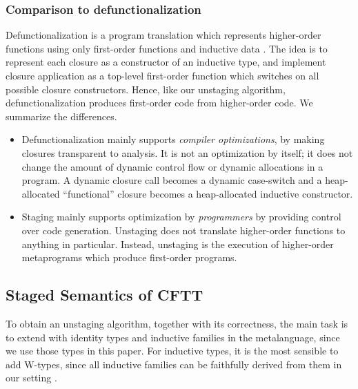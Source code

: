 \documentclass[acmsmall]{acmart}
\theoremstyle{remark}
\begin{document}
\subsubsection{Comparison to defunctionalization}
Defunctionalization is a program translation which represents higher-order
functions using only first-order functions and inductive data
\cite{DBLP:journals/lisp/Reynolds98a,DBLP:conf/ppdp/DanvyN01}. The idea is to
represent each closure as a constructor of an inductive type, and implement
closure application as a top-level first-order function which switches on all
possible closure constructors. Hence, like our unstaging algorithm,
defunctionalization produces first-order code from higher-order code. We summarize
the differences.
\begin{itemize}
\item Defunctionalization mainly supports \emph{compiler optimizations}, by making
  closures transparent to analysis. It is not an optimization by itself; it does
  not change the amount of dynamic control flow or dynamic allocations in a
  program. A dynamic closure call becomes a dynamic case-switch and a
  heap-allocated ``functional'' closure becomes a heap-allocated inductive
  constructor.
\item Staging mainly supports optimization by \emph{programmers} by providing
  control over code generation. Unstaging does not translate higher-order
  functions to anything in particular. Instead, unstaging is the execution of
  higher-order metaprograms which produce first-order programs.
\end{itemize}

\subsection{Staged Semantics of CFTT}\label{sec:semantics-of-staging}

To obtain an unstaging algorithm, together with its correctness, the main task
is to extend \cite{staged2ltt} with identity types and inductive families in the
metalanguage, since we use those types in this paper. For inductive types, it is the
most sensible to add W-types, since all inductive families can be faithfully
derived from them in our setting \cite{whynotw}.
\end{document}
